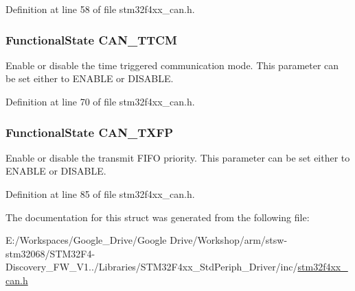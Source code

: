 Definition at line 58 of file stm32f4xx\-\_\-can.\-h.

\hypertarget{struct_c_a_n___init_type_def_ad3f995849aaf6dfbd79e0e70a37f28a9}{
\subsubsection[{C\-A\-N\-\_\-\-T\-T\-C\-M}]{\setlength{\rightskip}{0pt plus 5cm}Functional\-State C\-A\-N\-\_\-\-T\-T\-C\-M}}\label{struct_c_a_n___init_type_def_ad3f995849aaf6dfbd79e0e70a37f28a9}
Enable or disable the time triggered communication mode. This parameter can be set either to E\-N\-A\-B\-L\-E or D\-I\-S\-A\-B\-L\-E. 

Definition at line 70 of file stm32f4xx\-\_\-can.\-h.

\hypertarget{struct_c_a_n___init_type_def_a8f9c54b9a3f5663b482247a23d9cbf20}{
\subsubsection[{C\-A\-N\-\_\-\-T\-X\-F\-P}]{\setlength{\rightskip}{0pt plus 5cm}Functional\-State C\-A\-N\-\_\-\-T\-X\-F\-P}}\label{struct_c_a_n___init_type_def_a8f9c54b9a3f5663b482247a23d9cbf20}
Enable or disable the transmit F\-I\-F\-O priority. This parameter can be set either to E\-N\-A\-B\-L\-E or D\-I\-S\-A\-B\-L\-E. 

Definition at line 85 of file stm32f4xx\-\_\-can.\-h.



The documentation for this struct was generated from the following file\-:\begin{DoxyCompactItemize}
\item 
E\-:/\-Workspaces/\-Google\-\_\-\-Drive/\-Google Drive/\-Workshop/arm/stsw-\/stm32068/\-S\-T\-M32\-F4-\/\-Discovery\-\_\-\-F\-W\-\_\-\-V1../\-Libraries/\-S\-T\-M32\-F4xx\-\_\-\-Std\-Periph\-\_\-\-Driver/inc/\hyperlink{stm32f4xx__can_8h}{stm32f4xx\-\_\-can.\-h}\end{DoxyCompactItemize}

